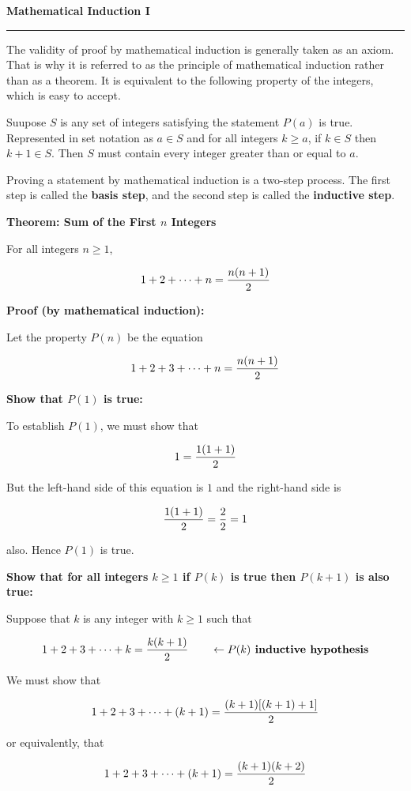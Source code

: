 {\bf Mathematical Induction I}
\vskip 1mm
\hrule

\vskip 1cm
The validity of proof by mathematical induction is generally taken as an axiom. That is why it is referred to as the principle of mathematical induction rather than as a theorem. It is equivalent to the following property of the integers, which is easy to accept.

\vskip 1mm
Suupose $S$ is any set of integers satisfying the statement $P(a)$ is true. Represented in set notation as $a\in S$ and for all integers $k\geq a$, if $k \in S$ then $k+1\in S$. Then $S$ must contain every integer greater than or equal to $a$.

\vskip 1mm
Proving a statement by mathematical induction is a two-step process. The first step is called the {\bf basis step}, and the second step is called the {\bf inductive step}.

\filbreak
\vskip 1cm
{\bf Theorem: Sum of the First $n$ Integers}

\vskip 1mm
For all integers $n\geq 1$,

$$1+2+\cdots+n={n(n+1)\over 2}$$

\vskip 3mm
{\bf Proof (by mathematical induction):}

\vskip 1mm
Let the property $P(n)$ be the equation

$$1+2+3+\cdots+n={n(n+1)\over 2}$$

{\bf Show that $P(1)$ is true:}

\vskip 1mm
To establish $P(1)$, we must show that

$$1={1(1+1)\over 2}$$

But the left-hand side of this equation is $1$ and the right-hand side is

$${1(1+1)\over 2}={2\over 2}= 1$$

also. Hence $P(1)$ is true.

\vskip 2mm
{\bf Show that for all integers $k\geq 1$ if $P(k)$ is true then $P(k+1)$ is also true:}

\vskip 1mm
Suppose that $k$ is any integer with $k\geq 1$ such that

$$1+2+3+\cdots+k={k(k+1)\over 2}\qquad\leftarrow\hbox{\bf $P(k)$ inductive hypothesis}$$

We must show that

$$1+2+3+\cdots+(k+1)={(k+1)[(k+1)+1]\over 2}$$

or equivalently, that

$$1+2+3+\cdots+(k+1)={(k+1)(k+2)\over 2}$$

